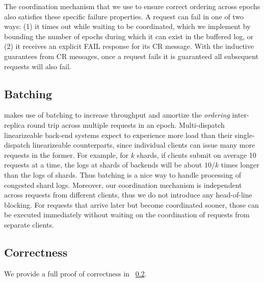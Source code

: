 The coordination mechanism that we use to ensure correct ordering across epochs also satisfies these specific failure properties. A request can fail in one of two ways: (1) it times out while waiting to be coordinated, which we implement by bounding the number of epochs during which it can exist in the buffered log, or (2) it receives an explicit FAIL response for its CR message. With the inductive guarantees from CR messages, once a request fails it is guaranteed all subsequent requests will also fail.

\subsection{Batching}
\md makes use of batching to increase throughput and amortize the \textit{ordering} inter-replica round trip across multiple requests in an epoch. Multi-dispatch linearizeable back-end systems expect to experience more load than their single-dispatch linearizeable counterparts, since individual clients can issue many more requests in the former. For example, for $k$ shards, if clients submit on average 10 requests at a time, the logs at shards of \md backends will be about $10/k$ times longer than the logs of \sd shards. Thus batching is a nice way to handle processing of congested shard logs. Moreover, our coordination mechanism is independent across requests from different clients, thus we do not introduce any head-of-line blocking. For requests that arrive later but become coordinated sooner, those can be executed immediately without waiting on the coordination of requests from separate clients.

\subsection{Correctness}
We provide a full proof of correctness in ~\ref{}.

